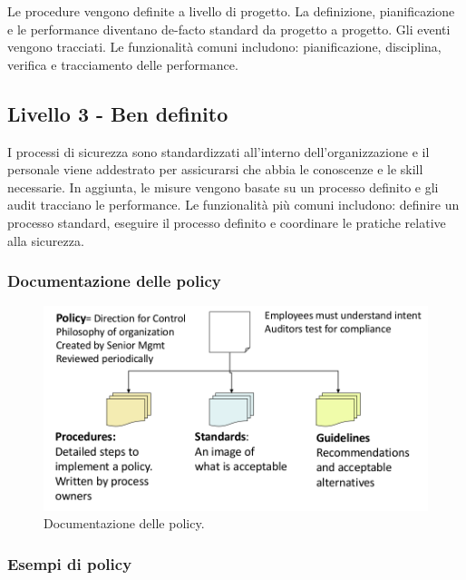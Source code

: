Le procedure vengono definite a livello di progetto. La definizione, 
pianificazione e le performance diventano de-facto standard da progetto a 
progetto. Gli eventi vengono tracciati. Le funzionalità comuni includono: 
pianificazione, disciplina, verifica e tracciamento delle performance.

\subsection{Livello 3 - Ben definito}

I processi di sicurezza sono standardizzati all'interno dell'organizzazione e 
il personale viene addestrato per assicurarsi che abbia le conoscenze e le 
skill necessarie. In aggiunta, le misure vengono basate su un processo 
definito e gli audit tracciano le performance. Le funzionalità più comuni 
includono: definire un processo standard, eseguire il processo definito e 
coordinare le pratiche relative alla sicurezza.


\subsubsection*{Documentazione delle policy}

\begin{figure}[h!]
        \begin{center}
                \includegraphics[scale=0.4]{res/img/documentation_policy}
        \end{center}
        \caption{Documentazione delle policy.}
\end{figure}

\subsubsection{Esempi di policy}

